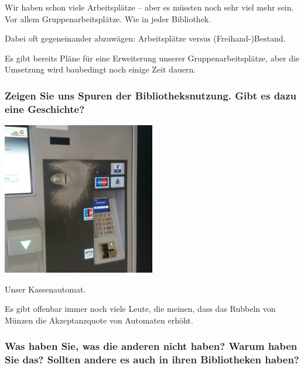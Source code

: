 Wir haben schon viele Arbeitsplätze -- aber es müssten noch sehr viel
mehr sein. Vor allem Gruppenarbeitsplätze. Wie in jeder Bibliothek.

Dabei oft gegeneinander abzuwägen: Arbeitsplätze versus
(Freihand-)Bestand.

Es gibt bereits Pläne für eine Erweiterung unserer Gruppenarbeitsplätze,
aber die Umsetzung wird baubedingt noch einige Zeit dauern.

\hypertarget{zeigen-sie-uns-spuren-der-bibliotheksnutzung.-gibt-es-dazu-eine-geschichte}{%
\subsubsection*{Zeigen Sie uns Spuren der Bibliotheksnutzung. Gibt es dazu eine
Geschichte?}\label{zeigen-sie-uns-spuren-der-bibliotheksnutzung.-gibt-es-dazu-eine-geschichte}}

\begin{center}
\includegraphics[width=0.5\textwidth]{ulb-muenster/img/kassenautomat.jpg}
\end{center}

Unser Kassenautomat.

Es gibt offenbar immer noch viele Leute, die meinen, dass das Rubbeln
von Münzen die Akzeptanzquote von Automaten erhöht.

\hypertarget{was-haben-sie-was-die-anderen-nicht-haben-warum-haben-sie-das-sollten-andere-es-auch-in-ihren-bibliotheken-haben}{%
\subsubsection*{Was haben Sie, was die anderen nicht haben? Warum haben Sie
das? Sollten andere es auch in ihren Bibliotheken
haben?}\label{was-haben-sie-was-die-anderen-nicht-haben-warum-haben-sie-das-sollten-andere-es-auch-in-ihren-bibliotheken-haben}}


